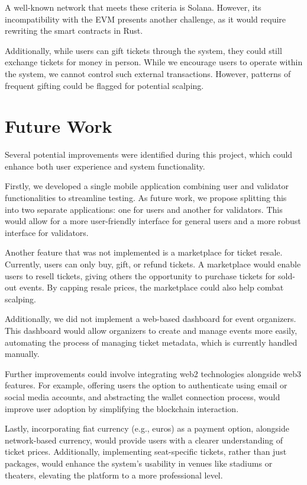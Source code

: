 A well-known network that meets these criteria is Solana. However, its
incompatibility with the EVM presents another challenge, as it would require
rewriting the smart contracts in Rust.

Additionally, while users can gift tickets through the system, they could still
exchange tickets for money in person. While we encourage users to operate
within the system, we cannot control such external transactions. However,
patterns of frequent gifting could be flagged for potential scalping.

\section{Future Work}
\label{sec:future_work}

Several potential improvements were identified during this project, which could
enhance both user experience and system functionality.

Firstly, we developed a single mobile application combining user and validator
functionalities to streamline testing. As future work, we propose splitting
this into two separate applications: one for users and another for validators.
This would allow for a more user-friendly interface for general users and a
more robust interface for validators.

Another feature that was not implemented is a marketplace for ticket resale.
Currently, users can only buy, gift, or refund tickets. A marketplace would
enable users to resell tickets, giving others the opportunity to purchase
tickets for sold-out events. By capping resale prices, the marketplace could
also help combat scalping.

Additionally, we did not implement a web-based dashboard for event organizers.
This dashboard would allow organizers to create and manage events more easily,
automating the process of managing ticket metadata, which is currently handled
manually.

Further improvements could involve integrating web2 technologies alongside web3
features. For example, offering users the option to authenticate using email or
social media accounts, and abstracting the wallet connection process, would
improve user adoption by simplifying the blockchain interaction.

Lastly, incorporating fiat currency (e.g., euros) as a payment option,
alongside network-based currency, would provide users with a clearer
understanding of ticket prices. Additionally, implementing seat-specific
tickets, rather than just packages, would enhance the system's usability in
venues like stadiums or theaters, elevating the platform to a more professional
level.
